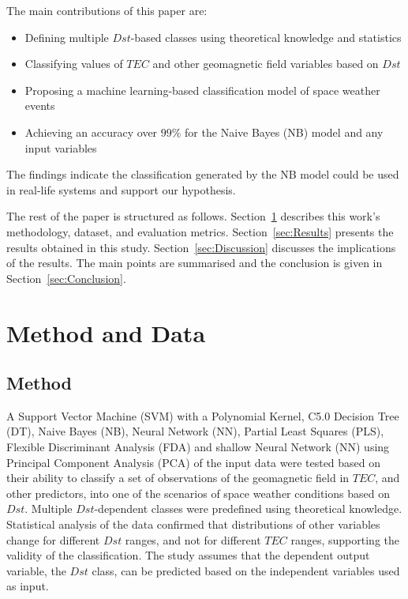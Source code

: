 \documentclass[sn-mathphys-num]{sn-jnl}%
\begin{document}
The main contributions of this paper are:

\begin{itemize}
    \item Defining multiple $Dst$-based classes using theoretical knowledge and statistics
    \item Classifying values of $TEC$ and other geomagnetic field variables based on $Dst$
    \item Proposing a machine learning-based classification model of space weather events
    \item Achieving an accuracy over $99\%$ for the Naive Bayes (NB) model and any input variables
\end{itemize}

The findings indicate the classification generated by the NB model could be used in real-life systems and support our hypothesis.

The rest of the paper is structured as follows. Section~\ref{sec:Dataset} describes this work's methodology, dataset, and evaluation metrics. Section~\ref{sec:Results} presents the results obtained in this study. Section~\ref{sec:Discussion} discusses the implications of the results. The main points are summarised and the conclusion is given in Section~\ref{sec:Conclusion}.

\section{Method and Data}
\label{sec:Dataset}

\subsection{Method}

A Support Vector Machine (SVM) with a Polynomial Kernel, C5.0 Decision Tree (DT), Naive Bayes (NB), Neural Network (NN), Partial Least Squares (PLS), Flexible Discriminant Analysis (FDA) and shallow Neural Network (NN) using Principal Component Analysis (PCA) of the input data were tested based on their ability to classify a set of observations of the geomagnetic field in $TEC$, and other predictors, into one of the scenarios of space weather conditions based on $Dst$. Multiple $Dst$-dependent classes were predefined using theoretical knowledge. Statistical analysis of the data confirmed that distributions of other variables change for different $Dst$ ranges, and not for different $TEC$ ranges, supporting the validity of the classification. The study assumes that the dependent output variable, the $Dst$ class, can be predicted based on the independent variables used as input.
\end{document}
